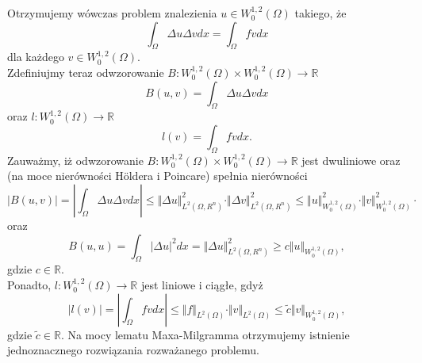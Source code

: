 \documentclass[12pt,a4paper,oneside,titlepage]{article}
\begin{document}
\indent
Otrzymujemy wówczas problem znalezienia $u \in W^{1,2}_0(\Omega)$ takiego, że
\begin{equation}
\int_{\Omega} \Delta u \Delta v dx = \int_{\Omega} f v dx
\end{equation}
dla każdego $v \in W^{1,2}_0 (\Omega)$. \\
\medskip
Zdefiniujmy teraz odwzorowanie $B:W^{1,2}_0(\Omega) \times W^{1,2}_0(\Omega) \rightarrow \mathbb{R} $
\begin{equation}
\nonumber
B(u,v) = \int_{\Omega} \Delta u \Delta v dx
\end{equation}
oraz $l: W^{1,2}_0(\Omega) \rightarrow \mathbb{R}$ 
\begin{equation}
\nonumber
l(v) = \int_{\Omega} f v dx .
\end{equation}
Zauważmy, iż odwzorowanie $B:W^{1,2}_0(\Omega) \times W^{1,2}_0(\Omega) \rightarrow \mathbb{R} $ jest dwuliniowe oraz (na moce nierówności Höldera i Poincare) spełnia nierówności
\begin{equation}
\nonumber
\vert B(u,v) \vert = \left\vert \int_{\Omega} \Delta u \Delta v dx \right\vert \leq \Vert \Delta u \Vert^2_{L^2(\Omega,R^n)} \cdot \Vert \Delta v \Vert^2_{L^2(\Omega,R^n)} \leq \Vert u \Vert^2_{W^{1,2}_0 (\Omega)} \cdot \Vert v \Vert^2_{W^{1,2}_0 (\Omega)} \cdot 
\end{equation}
oraz
\begin{equation}
\nonumber
B(u,u) = \int_{\Omega} \vert \Delta u \vert^2 dx = \Vert \Delta u \Vert^2_{L^2(\Omega,R^n)} \geq c \Vert u \Vert_{W^{1,2}_0(\Omega)},
\end{equation}
gdzie $c \in \mathbb{R}$. \\
Ponadto, $l: W^{1,2}_0(\Omega) \rightarrow \mathbb{R}$ jest liniowe i ciągłe, gdyż
\begin{equation}
\nonumber
\vert l(v) \vert = \left\vert \int_{\Omega} f v dx \right\vert \leq \Vert f \Vert_{L^2(\Omega)} \cdot \Vert v \Vert_{L^2(\Omega)} \leq \widetilde{c} \Vert v \Vert_{W^{1,2}_0 (\Omega)},
\end{equation}
gdzie $\widetilde{c} \in \mathbb{R}$. Na mocy lematu Maxa-Milgramma otrzymujemy istnienie jednoznacznego rozwiązania rozważanego problemu.
\end{document}
